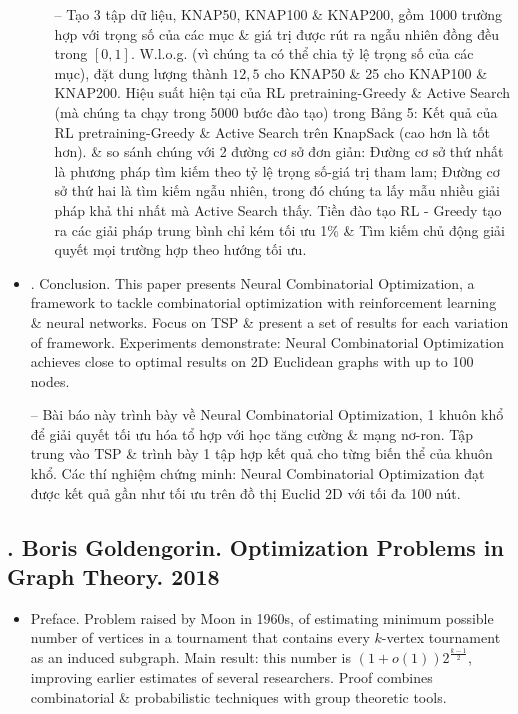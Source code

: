 \documentclass{article}
\begin{document}
\begin{itemize}
\begin{enumerate}
        -- Tạo 3 tập dữ liệu, KNAP50, KNAP100 \& KNAP200, gồm 1000 trường hợp với trọng số của các mục \& giá trị được rút ra ngẫu nhiên đồng đều trong $[0,1]$. W.l.o.g. (vì chúng ta có thể chia tỷ lệ trọng số của các mục), đặt dung lượng thành $12,5$ cho KNAP50 \& 25 cho KNAP100 \& KNAP200. Hiệu suất hiện tại của RL pretraining-Greedy \& Active Search (mà chúng ta chạy trong 5000 bước đào tạo) trong {\sf Bảng 5: Kết quả của RL pretraining-Greedy \& Active Search trên KnapSack (cao hơn là tốt hơn).} \& so sánh chúng với 2 đường cơ sở đơn giản: Đường cơ sở thứ nhất là phương pháp tìm kiếm theo tỷ lệ trọng số-giá trị tham lam; Đường cơ sở thứ hai là tìm kiếm ngẫu nhiên, trong đó chúng ta lấy mẫu nhiều giải pháp khả thi nhất mà Active Search thấy. Tiền đào tạo RL - Greedy tạo ra các giải pháp trung bình chỉ kém tối ưu 1\% \& Tìm kiếm chủ động giải quyết mọi trường hợp theo hướng tối ưu.        
    \end{enumerate}
    \item {. Conclusion.} This paper presents Neural Combinatorial Optimization, a framework to tackle combinatorial optimization with reinforcement learning \& neural networks. Focus on TSP \& present a set of results for each variation of framework. Experiments demonstrate: Neural Combinatorial Optimization achieves close to optimal results on 2D Euclidean graphs with up to 100 nodes.
    
    -- Bài báo này trình bày về Neural Combinatorial Optimization, 1 khuôn khổ để giải quyết tối ưu hóa tổ hợp với học tăng cường \& mạng nơ-ron. Tập trung vào TSP \& trình bày 1 tập hợp kết quả cho từng biến thể của khuôn khổ. Các thí nghiệm chứng minh: Neural Combinatorial Optimization đạt được kết quả gần như tối ưu trên đồ thị Euclid 2D với tối đa 100 nút.
\end{itemize}


\subsection{\cite{Goldengorin2018}. {\sc Boris Goldengorin}. Optimization Problems in Graph Theory. 2018}

\begin{itemize}
    \item {\sf Preface.} Problem raised by Moon in 1960s, of estimating minimum possible number of vertices in a tournament that contains every $k$-vertex tournament as an induced subgraph. Main result: this number is $(1 + o(1))2^{\frac{k-1}{2}}$, improving earlier estimates of several researchers. Proof combines combinatorial \& probabilistic techniques with group theoretic tools.
\end{itemize}
\end{document}
